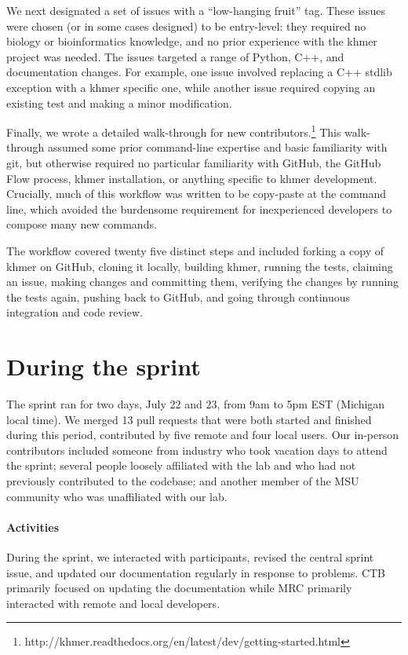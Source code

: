 \documentclass[11pt]{article}
\begin{document}
We next designated a set of issues with a ``low-hanging fruit'' tag.
These issues were chosen (or in some cases designed) to be
entry-level: they required no biology or bioinformatics knowledge, and
no prior experience with the khmer project was needed.  The issues
targeted a range of Python, C++, and documentation changes.  For
example, one issue involved replacing a C++ stdlib exception with a
khmer specific one, while another issue required copying an existing
test and making a minor modification.

Finally, we wrote a detailed walk-through for new
contributors.\footnote{http://khmer.readthedocs.org/en/latest/dev/getting-started.html}
This walk-through assumed some prior command-line expertise and basic
familiarity with git, but otherwise required no particular familiarity
with GitHub, the GitHub Flow process, khmer installation, or anything
specific to khmer development.  Crucially, much of this workflow was
written to be copy-paste at the command line, which avoided the
burdensome requirement for inexperienced developers to compose many
new commands.

The workflow covered twenty five distinct steps and included forking a
copy of khmer on GitHub, cloning it locally, building khmer, running
the tests, claiming an issue, making changes and committing them,
verifying the changes by running the tests again, pushing back to
GitHub, and going through continuous integration and code review.

\section{During the sprint}

The sprint ran for two days, July 22 and 23, from 9am to 5pm EST
(Michigan local time).  We merged 13 pull requests that were both
started and finished during this period, contributed by five remote
and four local users.  Our in-person contributors included someone
from industry who took vacation days to attend the sprint; several
people loosely affiliated with the lab and who had not previously
contributed to the codebase; and another member of the MSU community
who was unaffiliated with our lab.

\paragraph{Activities}
During the sprint, we interacted with participants, revised the
central sprint issue, and updated our documentation regularly in
response to problems.  CTB primarily focused on updating the
documentation while MRC primarily interacted with remote and local
developers.
\end{document}
